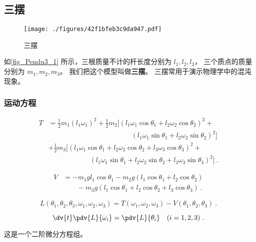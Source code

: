 \subsection{三摆}
\begin{figure}[ht]
\centering
\texttt{[image: ./figures/42f1bfeb3c9da947.pdf]}
\caption{三摆} \label{fig_Pendu3_1}
\end{figure}
如\autoref{fig_Pendu3_1} 所示，三根质量不计的杆长度分别为 $l_1, l_2, l_3$， 三个质点的质量分别为 $m_1, m_2, m_3$。 我们把这个模型叫做\textbf{三摆}。 三摆常用于演示物理学中的混沌现象。

\subsubsection{运动方程}
\begin{equation}
\begin{aligned}
T &= \frac{1}{2} m_1 (l_1 \omega_1)^2 + \frac{1}{2} m_2 [(l_1 \omega_1 \cos\theta_1 + l_2 \omega_2 \cos\theta_2)^2 +\\
&\qquad \qquad\qquad\qquad\qquad\qquad (l_1 \omega_1 \sin\theta_1 + l_2 \omega_2 \sin\theta_2)^2]\\
& + \frac{1}{2} m_3 [(l_1 \omega_1 \cos\theta_1 + l_2 \omega_2 \cos\theta_2 + l_3 \omega_3 \cos \theta_3)^2 +\\
&\qquad\qquad\qquad (l_1 \omega_1 \sin\theta_1 + l_2 \omega_2 \sin\theta_2 + l_3 \omega_3 \sin\theta_3)^2]~.
\end{aligned}
\end{equation}

\begin{equation} 
\begin{aligned} 
V &= -m_1 g l_1 \cos \theta_1 - m_2 g (l_1\cos \theta_1 + l_2 \cos \theta_2)\\
&\qquad - m_3 g (l_1 \cos\theta_1 + l_2 \cos \theta_2 + l_3 \cos \theta_3)~.
\end{aligned}
\end{equation}

\begin{equation}
L(\theta_1, \theta_2, \theta_3, \omega_1, \omega_2, \omega_3) = T(\omega_1, \omega_2, \omega_3) - V(\theta_1, \theta_2, \theta_3)~.
\end{equation}

\begin{equation}
\dv{t} \pdv{L}{\omega_i} = \pdv{L}{\theta_i} \quad (i=1,2,3)~.
\end{equation}

这是一个二阶微分方程组。


